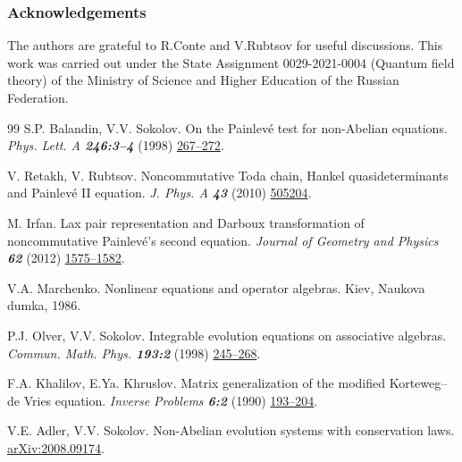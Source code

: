 \documentclass{article}
\theoremstyle{plain}
\theoremstyle{definition}
\begin{document}
\subsubsection*{Acknowledgements}

The authors are grateful to R.Conte and V.Rubtsov for useful discussions. This work was carried out under the State Assignment 0029-2021-0004 (Quantum field theory) of the Ministry of Science and Higher Education of the Russian Federation.
 
\begin{thebibliography}{99}
 S.P. Balandin, V.V. Sokolov. 
 On the Painlev\'e test for non-Abelian equations. {\em Phys. Lett. A \bf 246:3--4} (1998) 
 \href{http://dx.doi.org/10.1016/S0375-9601(98)00336-3}{267--272}.

 V. Retakh, V. Rubtsov. 
 Noncommutative Toda chain, Hankel quasideterminants and Painlev\'e II equation. {\em J. Phys. A \bfseries 43} (2010) 
 \href{https://doi.org/10.1088/1751-8113/43/50/505204}{505204}. 

 M. Irfan. 
 Lax pair representation and Darboux transformation of noncommutative Painlev\'e's second equation. 
 {\em Journal of Geometry and Physics \bf 62} (2012) 
 \href{https://doi.org/10.1016/j.geomphys.2012.01.008}{1575--1582}.
 
 V.A. Marchenko. Nonlinear equations and operator algebras. Kiev, Naukova dumka, 1986. 

 P.J. Olver, V.V. Sokolov.
 Integrable evolution equations on associative algebras.
 {\em Commun. Math. Phys. \bf 193:2} (1998) \href{http://dx.doi.org/10.1007/s002200050328}{245--268}.

 F.A. Khalilov, E.Ya. Khruslov.
 Matrix generalization of the modified Korteweg--de Vries equation.
 {\em Inverse Problems \bf 6:2} (1990) \href{http://dx.doi.org/10.1088/0266-5611/6/2/004}{193--204}.
 
  V.E. Adler, V.V. Sokolov. 
 Non-Abelian evolution systems with conservation laws. 
 \href{https://arxiv.org/abs/2008.09174}{arXiv:2008.09174}. 
\end{thebibliography}
\end{document}
